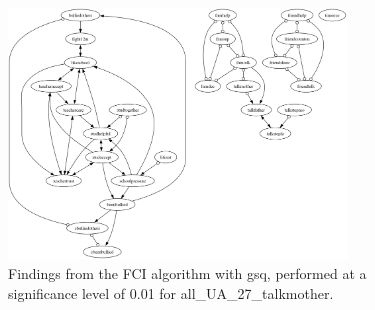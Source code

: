 \begin{figure}[htbp]
    \centering
    \includegraphics[width=0.8\textwidth]{Report/final_report/pictures/FCI_gsq_0.01_all_UA_27_talkmother.png}
    \caption{Findings from the FCI algorithm with gsq, performed at a significance level of 0.01 for all_UA_27_talkmother.}
    \label{fig:fci_gsq_0.01all_UA_27_talkmother}
\end{figure}
